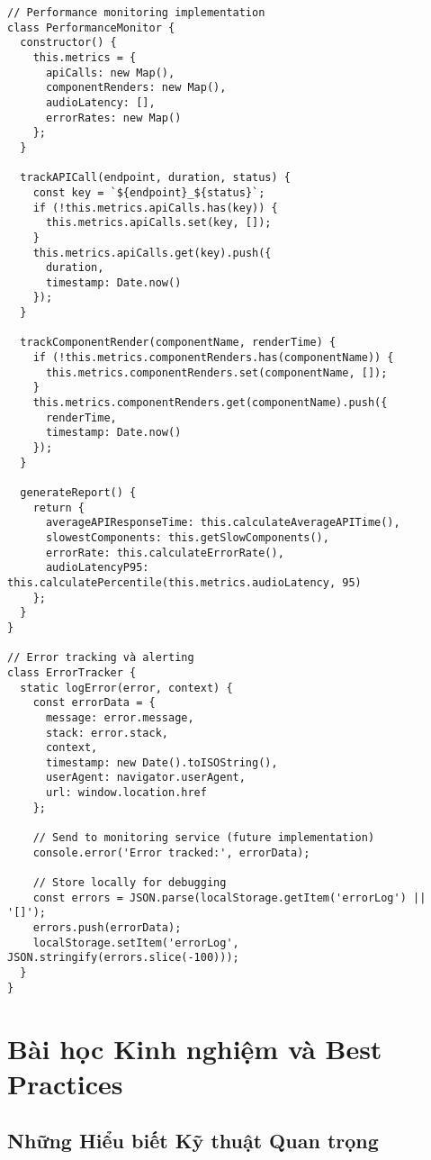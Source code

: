 \documentclass[12pt,a4paper]{article}
\begin{document}
\begin{lstlisting}[caption={Performance monitoring implementation}]
// Performance monitoring implementation
class PerformanceMonitor {
  constructor() {
    this.metrics = {
      apiCalls: new Map(),
      componentRenders: new Map(),
      audioLatency: [],
      errorRates: new Map()
    };
  }
  
  trackAPICall(endpoint, duration, status) {
    const key = `${endpoint}_${status}`;
    if (!this.metrics.apiCalls.has(key)) {
      this.metrics.apiCalls.set(key, []);
    }
    this.metrics.apiCalls.get(key).push({
      duration,
      timestamp: Date.now()
    });
  }
  
  trackComponentRender(componentName, renderTime) {
    if (!this.metrics.componentRenders.has(componentName)) {
      this.metrics.componentRenders.set(componentName, []);
    }
    this.metrics.componentRenders.get(componentName).push({
      renderTime,
      timestamp: Date.now()
    });
  }
  
  generateReport() {
    return {
      averageAPIResponseTime: this.calculateAverageAPITime(),
      slowestComponents: this.getSlowComponents(),
      errorRate: this.calculateErrorRate(),
      audioLatencyP95: this.calculatePercentile(this.metrics.audioLatency, 95)
    };
  }
}

// Error tracking và alerting
class ErrorTracker {
  static logError(error, context) {
    const errorData = {
      message: error.message,
      stack: error.stack,
      context,
      timestamp: new Date().toISOString(),
      userAgent: navigator.userAgent,
      url: window.location.href
    };
    
    // Send to monitoring service (future implementation)
    console.error('Error tracked:', errorData);
    
    // Store locally for debugging
    const errors = JSON.parse(localStorage.getItem('errorLog') || '[]');
    errors.push(errorData);
    localStorage.setItem('errorLog', JSON.stringify(errors.slice(-100)));
  }
}
\end{lstlisting}

\section{Bài học Kinh nghiệm và Best Practices}

\subsection{Những Hiểu biết Kỹ thuật Quan trọng}
\end{document}
